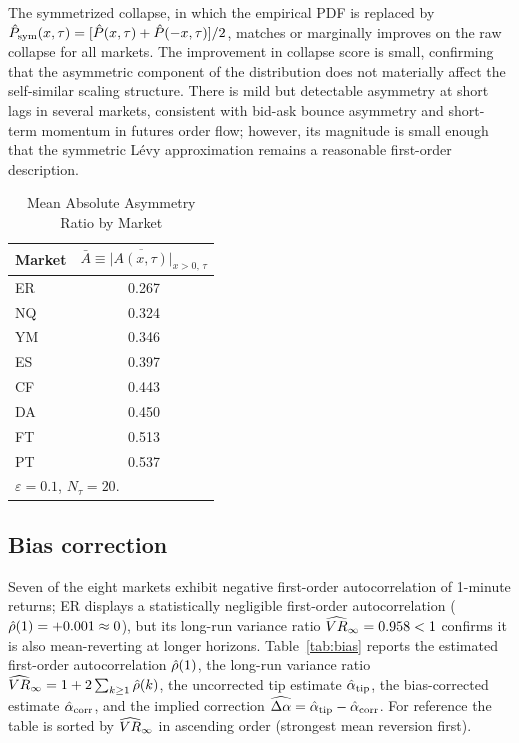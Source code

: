 \documentclass[12pt,a4paper]{article}
\begin{document}
The symmetrized collapse, in which the empirical PDF is replaced by
$\hat{P}_{\mathrm{sym}}(x,\tau) = [\hat{P}(x,\tau)+\hat{P}(-x,\tau)]/2$, matches or
marginally improves on the raw collapse for all markets.
The improvement in collapse score is small, confirming that the asymmetric
component of the distribution does not materially affect the self-similar
scaling structure.
There is mild but detectable asymmetry at short lags in several markets,
consistent with bid-ask bounce asymmetry and short-term momentum in futures
order flow; however, its magnitude is small enough that the symmetric Lévy
approximation remains a reasonable first-order description.

\begin{table}[htbp]
\begin{center}
\caption{Mean Absolute Asymmetry Ratio by Market}
\begin{tabular}{lc}
\hline
Market & $\bar{A} \equiv \overline{|A(x,\tau)|}_{x>0,\,\tau}$ \\
\hline
ER & 0.267 \\
NQ & 0.324 \\
YM & 0.346 \\
ES & 0.397 \\
CF & 0.443 \\
DA & 0.450 \\
FT & 0.513 \\
PT & 0.537 \\
\hline
\multicolumn{2}{l}{$\varepsilon=0.1$, $N_\tau=20$.}
\end{tabular}
\label{tab:asymmetry}
\end{center}
\end{table}


\subsection{Bias correction}
\label{sec:results:bias}

Seven of the eight markets exhibit negative first-order autocorrelation of
1-minute returns; ER displays a statistically negligible first-order autocorrelation
($\hat{\rho}(1)=+0.001\approx 0$), but its long-run variance ratio $\widehat{VR}_\infty=0.958<1$
confirms it is also mean-reverting at longer horizons.
Table~\ref{tab:bias} reports the estimated first-order autocorrelation
$\hat{\rho}(1)$, the long-run variance ratio
$\widehat{VR}_\infty = 1 + 2\sum_{k\geq 1}\hat{\rho}(k)$, the uncorrected tip estimate
$\hat{\alpha}_{\mathrm{tip}}$, the bias-corrected estimate $\hat{\alpha}_{\mathrm{corr}}$,
and the implied correction $\widehat{\Delta\alpha} = \hat{\alpha}_{\mathrm{tip}}
- \hat{\alpha}_{\mathrm{corr}}$.
For reference the table is sorted by $\widehat{VR}_\infty$ in ascending order (strongest
mean reversion first).
\end{document}
